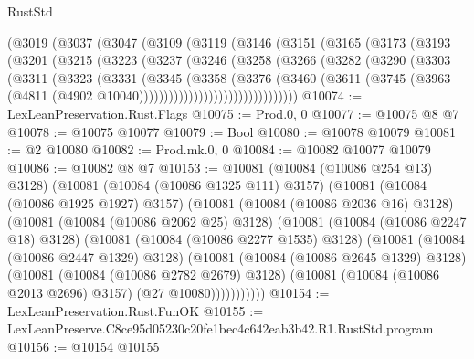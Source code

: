 \begin{lexlean}{RustStd}
\begin{coremodule}
    (@3019
      (@3037
        (@3047
          (@3109
            (@3119
              (@3146
                (@3151
                  (@3165
                    (@3173
                      (@3193
                        (@3201
                          (@3215
                            (@3223
                              (@3237
                                (@3246
                                  (@3258
                                    (@3266
                                      (@3282
                                        (@3290
                                          (@3303
                                            (@3311
                                              (@3323
                                                (@3331
                                                  (@3345
                                                    (@3358
                                                      (@3376
                                                        (@3460
                                                          (@3611
                                                            (@3745
                                                              (@3963
                                                                (@4811
                                                                  (@4902
                                                                    @10040))))))))))))))))))))))))))))))))
@10074 := LexLeanPreservation.Rust.Flags
@10075 := Prod.{0, 0}
@10077 := @10075 @8 @7
@10078 := @10075 @10077
@10079 := Bool
@10080 := @10078 @10079
@10081 := @2 @10080
@10082 := Prod.mk.{0, 0}
@10084 := @10082 @10077 @10079
@10086 := @10082 @8 @7
@10153 := @10081
    (@10084 (@10086 @254 @13) @3128)
    (@10081
      (@10084 (@10086 @1325 @111) @3157)
      (@10081
        (@10084 (@10086 @1925 @1927) @3157)
        (@10081
          (@10084 (@10086 @2036 @16) @3128)
          (@10081
            (@10084 (@10086 @2062 @25) @3128)
            (@10081
              (@10084 (@10086 @2247 @18) @3128)
              (@10081
                (@10084 (@10086 @2277 @1535) @3128)
                (@10081
                  (@10084 (@10086 @2447 @1329) @3128)
                  (@10081
                    (@10084 (@10086 @2645 @1329) @3128)
                    (@10081
                      (@10084 (@10086 @2782 @2679) @3128)
                      (@10081 (@10084 (@10086 @2013 @2696) @3157) (@27 @10080)))))))))))
@10154 := LexLeanPreservation.Rust.FunOK
@10155 := LexLeanPreserve.C8ce95d05230c20fe1bec4c642eab3b42.R1.RustStd.program
@10156 := @10154 @10155

\end{coremodule}
\end{lexlean}
